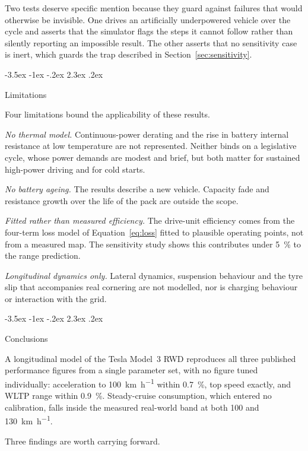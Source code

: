 \documentclass[twocolumn]{article}
\makeatletter
\renewcommand\section{\@startsection{section}{1}{\z@}%
  {-3.5ex \@plus -1ex \@minus -.2ex}%
  {2.3ex \@plus.2ex}%
  {\raggedright\normalfont\Large\bfseries}}
\makeatother
\begin{document}
Two tests deserve specific mention because they guard against failures that
would otherwise be invisible. One drives an artificially underpowered vehicle
over the cycle and asserts that the simulator flags the steps it cannot follow
rather than silently reporting an impossible result. The other asserts that no
sensitivity case is inert, which guards the trap described in
Section~\ref{sec:sensitivity}.

\section{Limitations}
\label{sec:limitations}

Four limitations bound the applicability of these results.

\emph{No thermal model.} Continuous-power derating and the rise in battery
internal resistance at low temperature are not represented. Neither binds on a
legislative cycle, whose power demands are modest and brief, but both matter
for sustained high-power driving and for cold starts.

\emph{No battery ageing.} The results describe a new vehicle. Capacity fade and
resistance growth over the life of the pack are outside the scope.

\emph{Fitted rather than measured efficiency.} The drive-unit efficiency comes
from the four-term loss model of Equation~\ref{eq:loss} fitted to plausible
operating points, not from a measured map. The sensitivity study shows this
contributes under \SI{5}{\percent} to the range prediction.

\emph{Longitudinal dynamics only.} Lateral dynamics, suspension behaviour and
the tyre slip that accompanies real cornering are not modelled, nor is charging
behaviour or interaction with the grid.

\section{Conclusions}

A longitudinal model of the Tesla Model~3 RWD reproduces all three published
performance figures from a single parameter set, with no figure tuned
individually: acceleration to \SI{100}{\kilo\metre\per\hour} within
\SI{0.7}{\percent}, top speed exactly, and WLTP range within
\SI{0.9}{\percent}. Steady-cruise consumption, which entered no calibration,
falls inside the measured real-world band at both \SI{100}{} and
\SI{130}{\kilo\metre\per\hour}.

Three findings are worth carrying forward.
\end{document}
